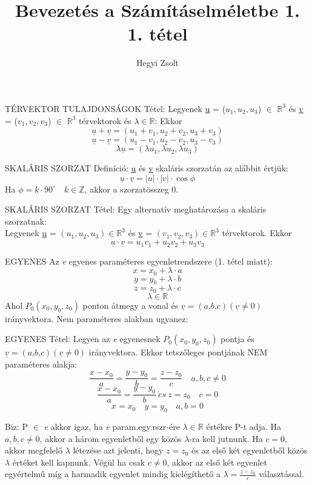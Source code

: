 \documentclass[]{article}
\title{Bevezetés a Számításelméletbe 1.\\{\large 1. tétel}}
\author{Hegyi Zsolt}
\newcommand{\R}{\mathbb{R}}
\newcommand{\Rn}[1]{$\mathbb{R}^{#1}$}
\begin{document}
\maketitle{}
\begin{framed}
TÉRVEKTOR TULAJDONSÁGOK Tétel: Legyenek \underline{u} = ($u_1, u_2, u_3$) $\in$ \Rn{3} és \underline{v} = ($v_1, v_2, v_3$) $\in$ \Rn{3} térvektorok és $\lambda \in \R$: Ekkor\\
$$\underline{u} + \underline{v} = (u_1 + v_1, u_2 + v_2, u_3 + v_3)$$
$$\underline{u} - \underline{v} = (u_1 - v_1, u_2 - v_2, u_3 - v_3)$$
$$\lambda \underline{u} = (\lambda u_1,\lambda u_2, \lambda u_3)$$
\end{framed}
\begin{shaded}
SKALÁRIS SZORZAT Definíció: \underline{u} és \underline{v} skaláris szorzatán az alábbit értjük: 
$$\underline{u}\cdot\underline{v} = |u|\cdot|v|\cdot\cos\phi$$
Ha $\phi = k\cdot90^{\circ}\quad k\in\mathbb{Z}$, akkor a szorzatösszeg 0.
\end{shaded}
\begin{framed}
SKALÁRIS SZORZAT Tétel: Egy alternatív meghatározása a skaláris szorzatnak: \\Legyenek \underline{u} = $(u_1, u_2, u_3)\in$\Rn{3} és \underline{v} = $(v_1, v_2, v_3)\in$\Rn{3} térvektorok. Ekkor $$\underline{u}\cdot\underline{v} = u_1 v_1 + u_2 v_2 + u_3 v_3$$
\end{framed}
EGYENES Az \textit{e} egyenes paraméteres egyenletrendszere (1. tétel miatt):
$$x = x_0 + \lambda \cdot a$$
$$y = y_0 + \lambda \cdot b$$
$$z = z_0 + \lambda \cdot c$$
$$\lambda \in \R$$
Ahol $P_0 (x_0,y_0,z_0)$ ponton átmegy a vonal és $\underline{v} = (\textit{a,b,c})  (\underline{v} \neq 0)$ irányvektora.
Nem paraméteres alakban ugyanez:
\begin{framed}
EGYENES Tétel: Legyen az \textit{e} egyenesnek $P_0 (x_0,y_0,z_0)$ pontja és $\underline{v} = (\textit{a,b,c})  (\underline{v} \neq 0)$ irányvektora. Ekkor tetszőleges pontjának NEM paraméteres alakja:
$$\frac{x-x_0}{a} = \frac{y-y_0}{b} = \frac{z-z_0}{c}\quad a, b, c \neq 0$$
$$\frac{x-x_0}{a} = \frac{y-y_0}{b} \:\acute{e}s\: z = z_0 \quad c = 0$$
$$x = x_0\quad y = y_0\quad a,b = 0$$
\end{framed}
\begin{leftbar}
Biz: P $\in$ \textit{e} akkor igaz, ha \textit{e} param.egy.rszr-ére $\lambda \in \R$ értékre P-t adja. Ha $a,b,c \neq 0$, akkor a három egyenletből egy közös $\lambda$-ra kell jutnunk. Ha $c=0$, akkor megfelelő $\lambda$ létezése azt jelenti, hogy $z=z_0$ és az első két egyenletből közös $\lambda$ értéket kell kapnunk. Végül ha csak $c\neq0$, akkor az első két egyenlet egyértelmű míg a harmadik egyenlet mindig kielégíthető a $\lambda = \frac{z-z_0}{c}$ választással.
\end{leftbar}
\end{document}
